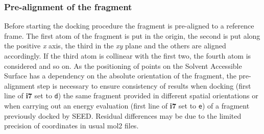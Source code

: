 \documentclass[a4paper,12pt,titlepage]{article}
\begin{document}

\subsubsection{Pre-alignment of the fragment} %
\label{sssec:prealign}
Before starting the docking procedure the fragment 
is pre-aligned to a reference frame. The first atom of the fragment is put in the origin, the second is put along the positive \textit{x} axis, the third in the \textit{xy} plane and the others are aligned accordingly. If the third atom is collinear with the first two, the fourth atom is considered and so on. As the positioning of points on the Solvent Accessible Surface has a dependency on the absolute orientation of the fragment, the pre-alignment step is necessary to ensure consistency of results when docking (first line of \textbf{i7} set to \texttt{d}) the same fragment provided in different spatial orientations or when carrying out an energy evaluation (first line of \textbf{i7} set to \texttt{e}) of a fragment previously docked by SEED. Residual differences may be due to the limited precision of coordinates in usual mol2 files.

\end{document}
